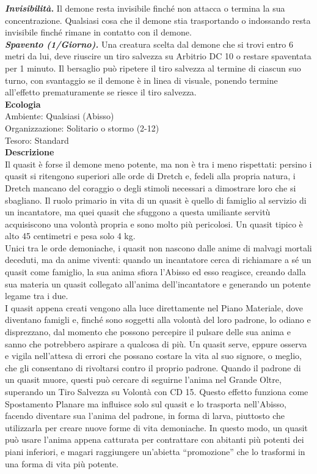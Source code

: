 \begin{multicols}{2}
\emph{\textbf{Invisibilità.}} Il demone resta invisibile finché non attacca o termina la sua concentrazione. Qualsiasi cosa che il demone stia trasportando o indossando resta invisibile finché rimane in contatto con il demone.\\
\emph{\textbf{Spavento (1/Giorno).}} Una creatura scelta dal demone che si trovi entro 6 metri da lui, deve riuscire un tiro salvezza su Arbitrio DC 10 o restare spaventata per 1 minuto. Il bersaglio può ripetere il tiro salvezza al termine di ciascun suo turno, con svantaggio se il demone è in linea di visuale, ponendo termine all'effetto prematuramente se riesce il tiro salvezza.\\
\textbf{Ecologia}\\
Ambiente: Qualsiasi (Abisso)\\
Organizzazione: Solitario o stormo (2-12)\\
Tesoro: Standard\\
\textbf{Descrizione}\\
Il quasit è forse il demone meno potente, ma non è tra i meno rispettati: persino i quasit si ritengono superiori alle orde di Dretch e, fedeli alla propria natura, i Dretch mancano del coraggio o degli stimoli necessari a dimostrare loro che si sbagliano. Il ruolo primario in vita di un quasit è quello di famiglio al servizio di un incantatore, ma quei quasit che sfuggono a questa umiliante servitù acquisiscono una volontà propria e sono molto più pericolosi. Un quasit tipico è alto 45 centimetri e pesa solo 4 kg.\\
Unici tra le orde demoniache, i quasit non nascono dalle anime di malvagi mortali deceduti, ma da anime viventi: quando un incantatore cerca di richiamare a sé un quasit come famiglio, la sua anima sfiora l'Abisso ed esso reagisce, creando dalla sua materia un quasit collegato all'anima dell’incantatore e generando un potente legame tra i due.\\
I quasit appena creati vengono alla luce direttamente nel Piano Materiale, dove diventano famigli e, finché sono soggetti alla volontà del loro padrone, lo odiano e disprezzano, dal momento che possono percepire il pulsare delle sua anima e sanno che potrebbero aspirare a qualcosa di più. Un quasit serve, eppure osserva e vigila nell'attesa di errori che possano costare la vita al suo signore, o meglio, che gli consentano di rivoltarsi contro il proprio padrone. Quando il padrone di un quasit muore, questi può cercare di seguirne l'anima nel Grande Oltre, superando un Tiro Salvezza su Volontà con CD 15. Questo effetto funziona come Spostamento Planare ma influisce solo sul quasit e lo trasporta nell'Abisso, facendo diventare sua l'anima del padrone, in forma di larva, piuttosto che utilizzarla per creare nuove forme di vita demoniache. In questo modo, un quasit può usare l'anima appena catturata per contrattare con abitanti più potenti dei piani inferiori, e magari raggiungere un'abietta “promozione” che lo trasformi in una forma di vita più potente.\\

\end{multicols}
